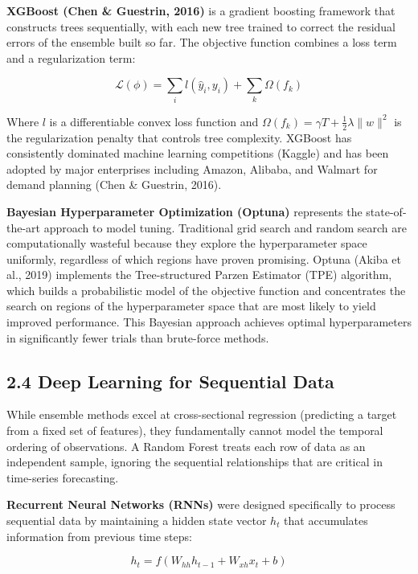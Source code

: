 \documentclass[12pt, a4paper]{report}
\begin{document}
\textbf{XGBoost (Chen \& Guestrin, 2016)} is a gradient boosting framework that constructs trees sequentially, with each new tree trained to correct the residual errors of the ensemble built so far. The objective function combines a loss term and a regularization term:

\begin{equation}
\mathcal{L}(\phi) = \sum_{i}l(\hat{y}_i, y_i) + \sum_{k}\Omega(f_k)
\end{equation}

Where $l$ is a differentiable convex loss function and $\Omega(f_k) = \gamma T + \frac{1}{2}\lambda\|w\|^2$ is the regularization penalty that controls tree complexity. XGBoost has consistently dominated machine learning competitions (Kaggle) and has been adopted by major enterprises including Amazon, Alibaba, and Walmart for demand planning (Chen \& Guestrin, 2016).

\textbf{Bayesian Hyperparameter Optimization (Optuna)} represents the state-of-the-art approach to model tuning. Traditional grid search and random search are computationally wasteful because they explore the hyperparameter space uniformly, regardless of which regions have proven promising. Optuna (Akiba et al., 2019) implements the Tree-structured Parzen Estimator (TPE) algorithm, which builds a probabilistic model of the objective function and concentrates the search on regions of the hyperparameter space that are most likely to yield improved performance. This Bayesian approach achieves optimal hyperparameters in significantly fewer trials than brute-force methods.

\subsection{2.4 Deep Learning for Sequential Data}

While ensemble methods excel at cross-sectional regression (predicting a target from a fixed set of features), they fundamentally cannot model the temporal ordering of observations. A Random Forest treats each row of data as an independent sample, ignoring the sequential relationships that are critical in time-series forecasting.

\textbf{Recurrent Neural Networks (RNNs)} were designed specifically to process sequential data by maintaining a hidden state vector $h_t$ that accumulates information from previous time steps:

\begin{equation}
h_t = f(W_{hh}h_{t-1} + W_{xh}x_t + b)
\end{equation}
\end{document}

